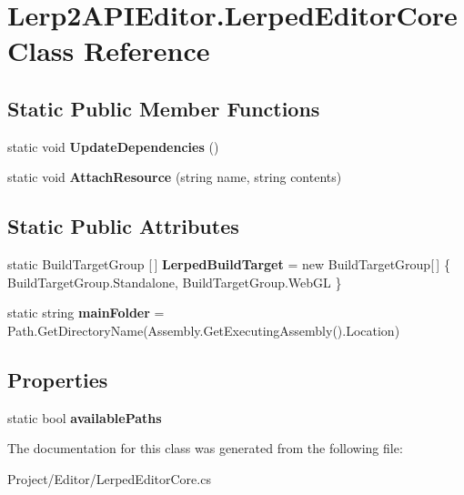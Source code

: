 \hypertarget{class_lerp2_a_p_i_editor_1_1_lerped_editor_core}{}\section{Lerp2\+A\+P\+I\+Editor.\+Lerped\+Editor\+Core Class Reference}
\label{class_lerp2_a_p_i_editor_1_1_lerped_editor_core}
\subsection*{Static Public Member Functions}
\begin{DoxyCompactItemize}
\item 
\mbox{\label{class_lerp2_a_p_i_editor_1_1_lerped_editor_core_afb029bab4edc9ae082b183370403e3c6}} 
static void {\bfseries Update\+Dependencies} ()
\item 
\mbox{\label{class_lerp2_a_p_i_editor_1_1_lerped_editor_core_af596bafdf9567527184224681f6f6907}} 
static void {\bfseries Attach\+Resource} (string name, string contents)
\end{DoxyCompactItemize}
\subsection*{Static Public Attributes}
\begin{DoxyCompactItemize}
\item 
\mbox{\label{class_lerp2_a_p_i_editor_1_1_lerped_editor_core_a010a0b96c2e9029eea1ab28b56f9686e}} 
static Build\+Target\+Group \mbox{[}$\,$\mbox{]} {\bfseries Lerped\+Build\+Target} = new Build\+Target\+Group\mbox{[}$\,$\mbox{]} \{ Build\+Target\+Group.\+Standalone, Build\+Target\+Group.\+Web\+GL \}
\item 
\mbox{\label{class_lerp2_a_p_i_editor_1_1_lerped_editor_core_aae797b81cb9e4bc1f42b9046f1e1759c}} 
static string {\bfseries main\+Folder} = Path.\+Get\+Directory\+Name(Assembly.\+Get\+Executing\+Assembly().Location)
\end{DoxyCompactItemize}
\subsection*{Properties}
\begin{DoxyCompactItemize}
\item 
\mbox{\label{class_lerp2_a_p_i_editor_1_1_lerped_editor_core_ae8f930032b75fb5aeaa237bb45f8ae86}} 
static bool {\bfseries available\+Paths}
\end{DoxyCompactItemize}


The documentation for this class was generated from the following file\+:\begin{DoxyCompactItemize}
\item 
Project/\+Editor/Lerped\+Editor\+Core.\+cs\end{DoxyCompactItemize}
